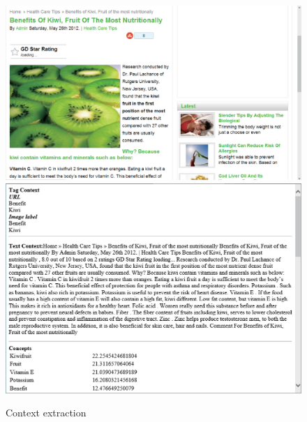 \begin{figure}[th]
\centering
\includegraphics[width=\columnwidth]{kiwi_ori.eps}
\\
\vspace*{4pt}
\includegraphics[width=\columnwidth]{kiwi_ctx.eps}
\caption{Context extraction}
\label{fig:kiwi-context}
\end{figure}
